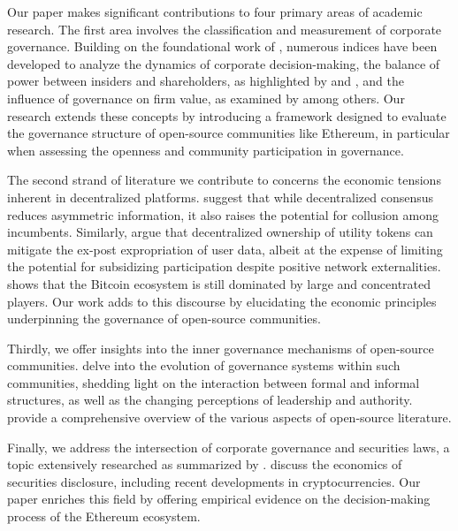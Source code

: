 \documentclass[No]{AEA}
\begin{document}
Our paper makes significant contributions to four primary areas of academic research. The first area involves the classification and measurement of corporate governance. Building on the foundational work of \cite{Gompers_Ishii2003}, numerous indices have been developed to analyze the dynamics of corporate decision-making, the balance of power between insiders and shareholders, as highlighted by \cite{JensenMeckling1976} and \cite{Bebchuketal2009}, and the influence of governance on firm value, as examined by \cite{Coreetal2006} among others. Our research extends these concepts by introducing a framework designed to evaluate the governance structure of open-source communities like Ethereum, in particular when assessing the openness and community participation in governance.

The second strand of literature we contribute to concerns the economic tensions inherent in decentralized platforms. \cite{Cong_Zhiguo2019} suggest that while decentralized consensus reduces asymmetric information, it also raises the potential for collusion among incumbents. Similarly, \cite{Sockin_Xiong2023} argue that decentralized ownership of utility tokens can mitigate the ex-post expropriation of user data, albeit at the expense of limiting the potential for subsidizing participation despite positive network externalities. \cite{MakarovSchoar22} shows that the Bitcoin ecosystem is still dominated by large and concentrated players. Our work adds to this discourse by elucidating the economic principles underpinning the governance of open-source communities. 

Thirdly, we offer insights into the inner governance mechanisms of open-source communities. \cite{Mahony_Ferraro2007} delve into the evolution of governance systems within such communities, shedding light on the interaction between formal and informal structures, as well as the changing perceptions of leadership and authority. \cite{LernerTirole2005} provide a comprehensive overview of the various aspects of open-source literature. 

Finally, we address the intersection of corporate governance and securities laws, a topic extensively researched as summarized by \cite{Mahoney2009}. \cite{Choi_Pritchard2019} discuss the economics of securities disclosure, including recent developments in cryptocurrencies. Our paper enriches this field by offering empirical evidence on the decision-making process of the Ethereum ecosystem.


\end{document}
